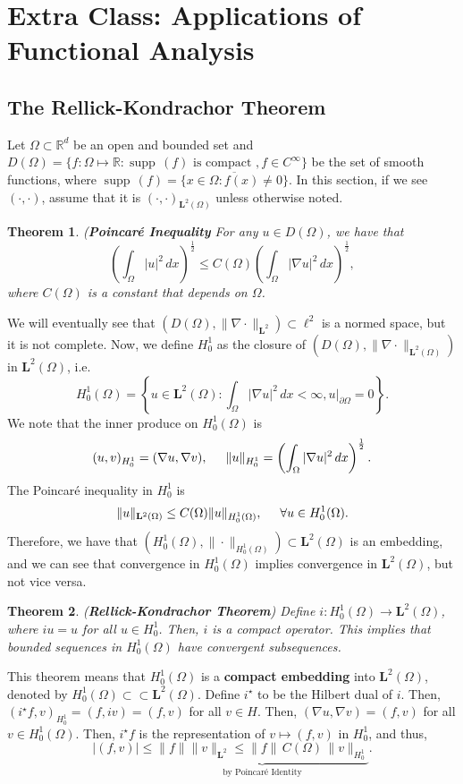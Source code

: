 \documentclass[12pt]{article}
\newtheorem{theorem}{Theorem}
\newcommand{\R}{{\mathbb R}}
\newcommand{\p}{\partial}
\newcommand{\Om}{\Omega}
\DeclareMathOperator{\supp}{supp\,}
\newcommand{\dint}{\displaystyle\int}
\newcommand{\dintom}{\dint_{\Om}}
\newcommand{\ov}{\overline}
\newcommand{\ml}{\mathbf{L}}
\newcommand{\sbs}{\subset}
\newcommand{\Hz}{H_0^1}
\newcommand{\Hzo}{H_0^1(\Om)}
\newcommand{\mlt}{\ml^2}
\newcommand{\mlto}{\ml^2(\Om)}
\newcommand{\is}{i^{\star}}
\begin{document}
\section*{Extra Class: Applications of Functional Analysis}
 \setcounter{theorem}{0}
 \setcounter{proposition}{0}
  \setcounter{definition}{0}
 \setcounter{corollary}{0}
 \setcounter{cons}{0}
 \setcounter{equation}{0}
 \setcounter{lemma}{0}
\subsection*{The Rellick-Kondrachor Theorem}
Let $\Om \sbs \R^d$ be an open and bounded set and $D(\Om) = \{ f: \Om \mapsto \R : \supp(f) \text{ is compact }, f \in C^{\infty} \}$ be the set of smooth functions, where $\supp(f) = \ov{\{ x \in \Om : f(x) \neq 0 \}}$. In this section, if we see $(\cdot, \cdot)$, assume that it is $(\cdot, \cdot)_{\ml^2(\Om)}$ unless otherwise noted. 
\begin{theorem}(\textbf{Poincar\'e Inequality}
For any $u \in D(\Om)$, we have that 
\[ \left( \dintom |u|^2 \, dx \right)^{\frac{1}{2}} \leq C(\Om) \left( \dintom |\nabla u|^2 \, dx \right)^{\frac{1}{2}},\]
where $C(\Om)$ is a constant that depends on $\Om$.
\end{theorem}
\vspace{-25pt}
We will eventually see that $\left( D(\Om), \| \nabla \cdot \|_{\ml^2} \right) \sbs \ell^2$ is a normed space, but it is not complete. Now, we define $\Hz$ as the closure of $\left( D(\Om), \| \nabla \cdot \|_{\ml^2(\Om)} \right)$ in $\ml^2(\Om)$, i.e. 
\[ \Hz(\Om) = \left\lbrace u \in \ml^2(\Om) : \dintom |\nabla u|^2\, dx < \infty, u \vert_{\p \Om} = 0 \right \rbrace. \]
We note that the inner produce on $\Hz(\Om)$ is 
\[ (u, v)_{\Hz} = (\nabla u, \nabla v),\hspace{5mm} \| u \|_{\Hz} =\left( \dintom | \nabla u|^2 \, dx \right)^{\frac{1}{2}}. \]
The Poincar\'e inequality in $\Hz$ is 
\[ \| u \|_{\ml^2(\Om)} \leq C(\Om) \| u \|_{\Hzo}, \hspace{5mm} \forall u \in \Hzo.\]
Therefore, we have that $(\Hzo, \| \cdot \|_{\Hzo}) \sbs \ml^2(\Om)$ is an embedding, and we can see that convergence in $\Hzo$ implies convergence in $\ml^2(\Om)$, but not vice versa. 
\begin{theorem}(\textbf{Rellick-Kondrachor Theorem}) Define $i: \Hzo \to \mlto$, where $iu = u$ for all $u \in \Hz$. Then, $i$ is a compact operator. This implies that bounded sequences in $\Hzo$ have convergent subsequences.
\end{theorem}
\vspace{-25pt}
This theorem means that $\Hzo$ is a \textbf{compact embedding} into $\mlto$, denoted by $\Hzo \sbs \sbs \mlto$. Define $\is$ to be the Hilbert dual of $i$. Then, $(\is f, v)_{\Hz} = (f, iv) = (f, v)$ for all $v \in H$. Then, $(\nabla u, \nabla v) = (f, v)$ for all $v \in \Hzo$. Then, $\is f$ is the representation of $v \mapsto (f, v)$ in $\Hz$, and thus, 
\[ |(f, v)| \leq \underbrace{\| f \| \| v \|_{\mlt} \leq \| f \|  \, C(\Om)  \, \| v \|_{\Hz}}_{\text{by Poincar\'e Identity}}. \]
\end{document}
